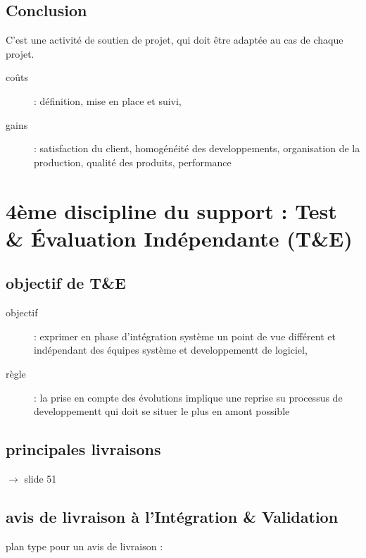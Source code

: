 	\subsection{Conclusion}

C’est une activité de soutien de projet, qui doit être adaptée au cas de chaque projet.

\begin{description}
	\item[coûts] : définition, mise en place et suivi,
	\item[gains] : satisfaction du client, homogénéité des developpements, organisation de la production, qualité des produits, performance
\end{description}

\section{4ème discipline du support : Test \& Évaluation Indépendante (T\&E)}

	\subsection{objectif de T\&E}
	\begin{description}	
		\item[objectif] : exprimer en phase d’intégration système un point de vue différent et indépendant des équipes système et developpementt de logiciel,
		\item[règle] : la prise en compte des évolutions implique une reprise su processus de developpementt qui doit se situer le plus en amont possible
	\end{description}

	\subsection{principales livraisons}
	$\rightarrow$ slide 51 %

	\subsection{avis de livraison à l’Intégration \& Validation}

	plan type pour un avis de livraison :

